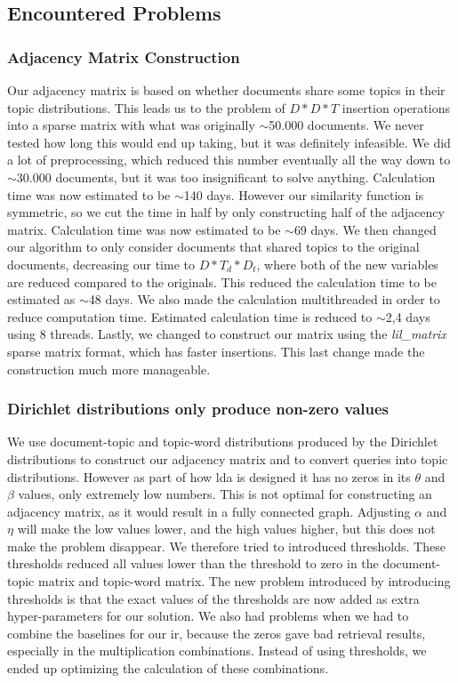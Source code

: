 \subsection{Encountered Problems}

\subsubsection{Adjacency Matrix Construction}\label{app:adj_matrix}
Our adjacency matrix is based on whether documents share some topics in their topic distributions. 
This leads us to the problem of $D*D*T$ insertion operations into a sparse matrix with what was originally $\sim$50.000 documents.
We never tested how long this would end up taking, but it was definitely infeasible.
We did a lot of preprocessing, which reduced this number eventually all the way down to $\sim$30.000 documents, but it was too insignificant to solve anything.
Calculation time was now estimated to be $\sim$140 days.
However our similarity function is symmetric, so we cut the time in half by only constructing half of the adjacency matrix.
Calculation time was now estimated to be $\sim$69 days.
We then changed our algorithm to only consider documents that shared topics to the original documents, decreasing our time to $D*T_d*D_t$, where both of the new variables are reduced compared to the originals.
This reduced the calculation time to be estimated as $\sim$48 days.
We also made the calculation multithreaded in order to reduce computation time.
Estimated calculation time is reduced to $\sim$2,4 days using 8 threads.
Lastly, we changed to construct our matrix using the \emph{lil\_matrix} sparse matrix format, which has faster insertions.
This last change made the construction much more manageable.



\subsubsection{Dirichlet distributions only produce non-zero values}
We use document-topic and topic-word distributions produced by the Dirichlet distributions to construct our adjacency matrix and to convert queries into topic distributions. 
However as part of how \gls{lda} is designed it has no zeros in its $\theta$ and $\beta$ values, only extremely low numbers.
This is not optimal for constructing an adjacency matrix, as it would result in a fully connected graph.
Adjusting $\alpha$ and $\eta$ will make the low values lower, and the high values higher, but this does not make the problem disappear.
We therefore tried to introduced thresholds.
These thresholds reduced all values lower than the threshold to zero in the document-topic matrix and topic-word matrix.
The new problem introduced by introducing thresholds is that the exact values of the thresholds are now added as extra hyper-parameters for our solution.
We also had problems when we had to combine the baselines for our \gls{ir}, because the zeros gave bad retrieval results, especially in the multiplication combinations.
Instead of using thresholds, we ended up optimizing the calculation of these combinations.


